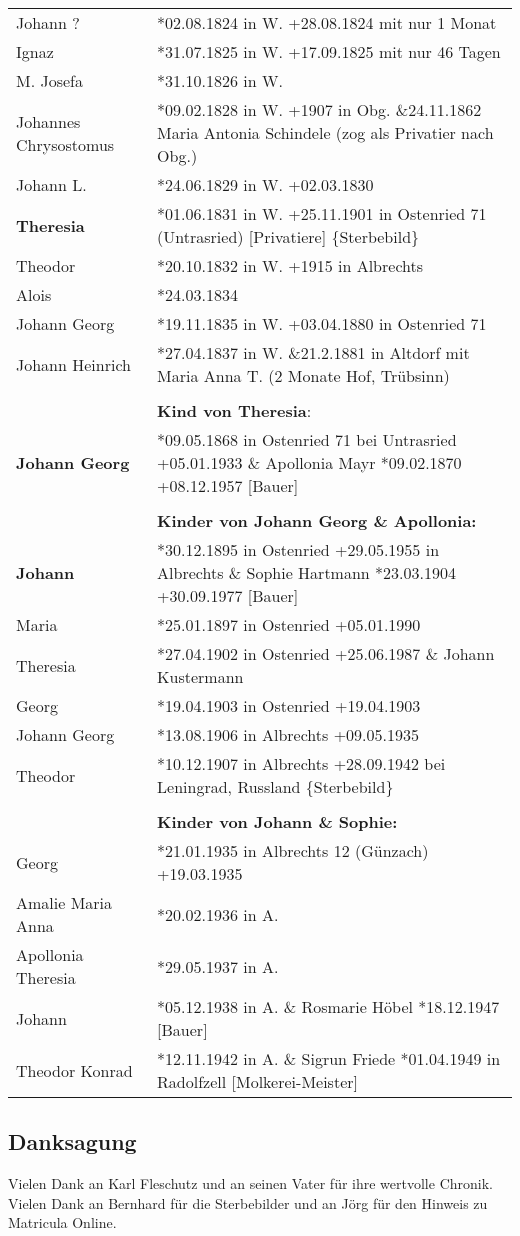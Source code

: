 \documentclass[
]{article}
\begin{document}
\begin{longtable}[]{@{}ll@{}}
Johann ? & *02.08.1824 in W. +28.08.1824 mit nur 1 Monat \\
Ignaz & *31.07.1825 in W. +17.09.1825 mit nur 46 Tagen \\
M. Josefa & *31.10.1826 in W. \\
Johannes Chrysostomus & *09.02.1828 in W. +1907 in Obg. \&24.11.1862
Maria Antonia Schindele (zog als Privatier nach Obg.) \\
Johann L. & *24.06.1829 in W. +02.03.1830 \\
\textbf{Theresia} & *01.06.1831 in W. +25.11.1901 in Ostenried 71
(Untrasried) {[}Privatiere{]} \{Sterbebild\} \\
Theodor & *20.10.1832 in W. +1915 in Albrechts \\
Alois & *24.03.1834 \\
Johann Georg & *19.11.1835 in W. +03.04.1880 in Ostenried 71 \\
Johann Heinrich & *27.04.1837 in W. \&21.2.1881 in Altdorf mit Maria
Anna T. (2 Monate Hof, Trübsinn) \\
& \\
& \textbf{Kind von Theresia}: \\
\textbf{Johann Georg} & *09.05.1868 in Ostenried 71 bei Untrasried
+05.01.1933 \& Apollonia Mayr *09.02.1870 +08.12.1957 {[}Bauer{]} \\
& \\
& \textbf{Kinder von Johann Georg \& Apollonia:} \\
\textbf{Johann} & *30.12.1895 in Ostenried +29.05.1955 in Albrechts \&
Sophie Hartmann *23.03.1904 +30.09.1977 {[}Bauer{]} \\
Maria & *25.01.1897 in Ostenried +05.01.1990 \\
Theresia & *27.04.1902 in Ostenried +25.06.1987 \& Johann Kustermann \\
Georg & *19.04.1903 in Ostenried +19.04.1903 \\
Johann Georg & *13.08.1906 in Albrechts +09.05.1935 \\
Theodor & *10.12.1907 in Albrechts +28.09.1942 bei Leningrad, Russland
\{Sterbebild\} \\
& \\
& \textbf{Kinder von Johann \& Sophie:} \\
Georg & *21.01.1935 in Albrechts 12 (Günzach) +19.03.1935 \\
Amalie Maria Anna & *20.02.1936 in A. \\
Apollonia Theresia & *29.05.1937 in A. \\
Johann & *05.12.1938 in A. \& Rosmarie Höbel *18.12.1947 {[}Bauer{]} \\
Theodor Konrad & *12.11.1942 in A. \& Sigrun Friede *01.04.1949 in
Radolfzell {[}Molkerei-Meister{]} \\
\end{longtable}

\subsection{Danksagung}\label{header-n369}

Vielen Dank an Karl Fleschutz und an seinen Vater für ihre wertvolle
Chronik. Vielen Dank an Bernhard für die Sterbebilder und an Jörg für
den Hinweis zu Matricula Online.
\end{document}
